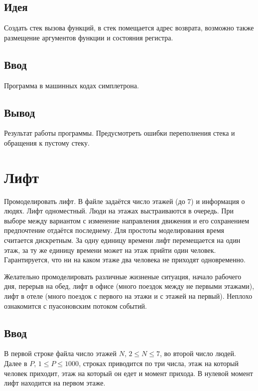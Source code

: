 \documentclass[12pt, oneside]{article}
\begin{document}
\subsection*{Идея}

Создать стек вызова функций, в стек помещается адрес возврата, возможно также размещение аргументов функции и состояния регистра.

\subsection*{Ввод}

Программа в машинных кодах симплетрона.

\subsection*{Вывод}

Результат работы программы. Предусмотреть ошибки переполнения стека и обращения к пустому стеку.

\section{Лифт}

Промоделировать лифт. В файле задаётся число этажей (до 7) и информация о людях. Лифт одноместный. Люди на этажах выстраиваются в очередь. При выборе между вариантом с изменение направления движения и его сохранением предпочтение отдаётся последнему. Для простоты моделирования время считается дискретным. За одну единицу времени лифт перемещается на один этаж, за ту же единицу времени может на этаж прийти один человек. Гарантируется, что ни на каком этаже два человека не приходят одновременно. 

Желательно промоделировать различные жизненые ситуация, начало рабочего дня, перерыв на обед, лифт в офисе (много поездок между не первыми этажами), лифт в отеле (много поездок с первого на этажи и с этажей на первый). Неплохо ознакомится с пуасоновским потоком событий.

\subsection*{Ввод}

В первой строке файла число этажей $N$, $2\leq{}N\leq7$, во второй число людей. Далее в $P$, $1\leq{}P\leq1000$, строках приводится по три числа, этаж на который человек приходит, этаж на который он едет и момент прихода. В нулевой момент лифт находится на первом этаже.
\end{document}
